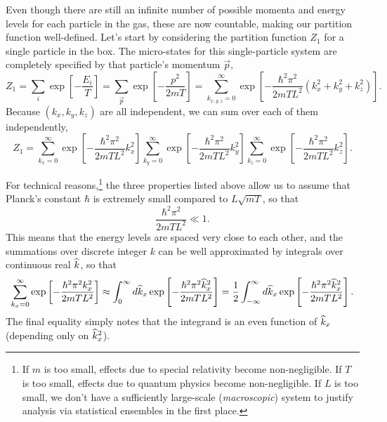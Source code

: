 Even though there are still an infinite number of possible momenta and energy levels for each particle in the gas, these are now countable, making our partition function well-defined.
Let's start by considering the partition function $Z_1$ for a single particle in the box.
The micro-states for this single-particle system are completely specified by that particle's momentum $\vec p$,
\begin{equation*}
  Z_1 = \sum_i \exp\left[-\frac{E_i}{T}\right] = \sum_{\vec p} \exp\left[-\frac{p^2}{2mT}\right] = \sum_{k_{x, y, z} = 0}^{\infty}\exp\left[-\frac{\hbar^2 \pi^2}{2mTL^2}\left(k_x^2 + k_y^2 + k_z^2\right)\right].
\end{equation*}
Because $(k_x, k_y, k_z)$ are all independent, we can sum over each of them independently,
\begin{equation*}
  Z_1 = \sum_{k_x = 0}^{\infty} \exp\left[-\frac{\hbar^2 \pi^2}{2mTL^2} k_x^2\right] \sum_{k_y = 0}^{\infty} \exp\left[-\frac{\hbar^2 \pi^2}{2mTL^2} k_y^2\right] \sum_{k_z = 0}^{\infty} \exp\left[-\frac{\hbar^2 \pi^2}{2mTL^2} k_z^2\right].
\end{equation*}

For technical reasons,\footnote{If $m$ is too small, effects due to special relativity become non-negligible.  If $T$ is too small, effects due to quantum physics become non-negligible.  If $L$ is too small, we don't have a sufficiently large-scale  (\textit{macroscopic}) system to justify analysis via statistical ensembles in the first place.} the three properties listed above allow us to assume that Planck's constant $\hbar$ is extremely small compared to $L\sqrt{mT}$, so that
\begin{equation*}
  \frac{\hbar^2 \pi^2}{2mTL^2} \ll 1.
\end{equation*}
This means that the energy levels are spaced very close to each other, and the summations over discrete integer $k$ can be well approximated by integrals over continuous real $\widehat k$, so that
\begin{equation*}
  \sum_{k_x = 0}^{\infty} \exp\left[-\frac{\hbar^2 \pi^2 k_x^2}{2mTL^2}\right] \approx \int_0^{\infty} d\widehat k_x \exp\left[-\frac{\hbar^2 \pi^2 \widehat k_x^2}{2mTL^2}\right] = \frac{1}{2} \int_{-\infty}^{\infty} d\widehat k_x \exp\left[-\frac{\hbar^2 \pi^2 \widehat k_x^2}{2mTL^2}\right].
\end{equation*}
The final equality simply notes that the integrand is an even function of $\widehat k_x$ (depending only on $\widehat k_x^2$).

